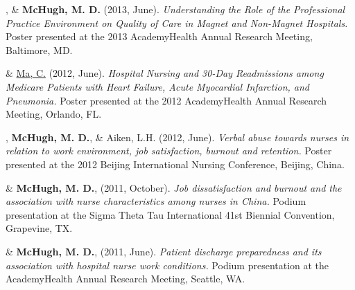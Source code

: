 \documentclass[10pt,]{article}
\begin{document}
{{{{{{{{{{{{{{\begin{hangparas}{.25in}{1}
, \& {\textbf {McHugh, M. D.}} (2013, June). {\textit {Understanding the Role of the Professional Practice Environment on Quality of Care in Magnet and Non-Magnet Hospitals.}} Poster presented at the 2013 AcademyHealth Annual Research Meeting, Baltimore, MD.

\end{hangparas}

\vspace{4mm}

\begin{hangparas}{.25in}{1}

 \& {\underline {Ma, C.}} (2012, June). {\textit {Hospital Nursing and 30-Day Readmissions among Medicare Patients with Heart Failure, Acute Myocardial Infarction, and Pneumonia.}} Poster presented at the 2012 AcademyHealth Annual Research Meeting, Orlando, FL.

\end{hangparas}

\vspace{4mm}

\begin{hangparas}{.25in}{1}

, {\textbf {McHugh, M. D.}}, \& Aiken, L.H. (2012, June). {\textit {Verbal abuse towards nurses in relation to work environment, job satisfaction, burnout and retention.}} Poster presented at the 2012 Beijing International Nursing Conference, Beijing, China.

\end{hangparas}

\vspace{4mm}

\begin{hangparas}{.25in}{1}

 \& {\textbf {McHugh, M. D.}}, (2011, October). {\textit {Job dissatisfaction and burnout and the association with nurse characteristics among nurses in China.}} Podium presentation at the Sigma Theta Tau International 41st Biennial Convention, Grapevine, TX.

\end{hangparas}

\vspace{4mm}

\begin{hangparas}{.25in}{1}

 \& {\textbf {McHugh, M. D.}}, (2011, June). {\textit {Patient discharge preparedness and its association with hospital nurse work conditions.}} Podium presentation at the AcademyHealth Annual Research Meeting, Seattle, WA.


\end{hangparas}}}}}}}}}}}}}}}
\end{document}
